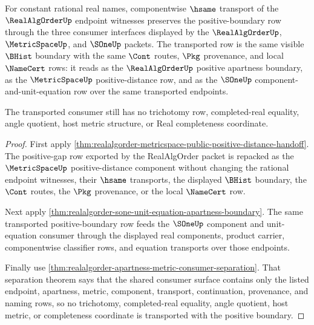 \begin{theorem}
\label{thm:realalgorder-metric-sone-positive-boundary-transport}
For constant rational real names, componentwise $\hsame$ transport of the
$\RealAlgOrderUp$ endpoint witnesses preserves the positive-boundary row
through the three consumer interfaces displayed by the $\RealAlgOrderUp$,
$\MetricSpaceUp$, and $\SOneUp$ packets. The transported row is the same
visible $\BHist$ boundary with the same $\Cont$ routes, $\Pkg$ provenance, and
local $\NameCert$ rows: it reads as the $\RealAlgOrderUp$ positive apartness
boundary, as the $\MetricSpaceUp$ positive-distance row, and as the $\SOneUp$
component-and-unit-equation row over the same transported endpoints.

The transported consumer still has no trichotomy row, completed-real equality,
angle quotient, host metric structure, or Real completeness coordinate.
\end{theorem}
\begin{proof}
First apply
\autoref{thm:realalgorder-metricspace-public-positive-distance-handoff}. The
positive-gap row exported by the RealAlgOrder packet is repacked as the
$\MetricSpaceUp$ positive-distance component without changing the rational
endpoint witnesses, their $\hsame$ transports, the displayed $\BHist$ boundary,
the $\Cont$ routes, the $\Pkg$ provenance, or the local $\NameCert$ row.

Next apply
\autoref{thm:realalgorder-sone-unit-equation-apartness-boundary}. The same
transported positive-boundary row feeds the $\SOneUp$ component and
unit-equation consumer through the displayed real components, product carrier,
componentwise classifier rows, and equation transports over those endpoints.

Finally use
\autoref{thm:realalgorder-apartness-metric-consumer-separation}. That
separation theorem says that the shared consumer surface contains only the
listed endpoint, apartness, metric, component, transport, continuation,
provenance, and naming rows, so no trichotomy, completed-real equality, angle
quotient, host metric, or completeness coordinate is transported with the
positive boundary.
\end{proof}

